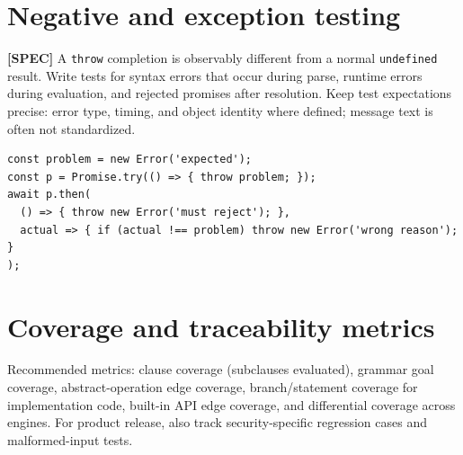 \documentclass[11pt,letterpaper]{article}
\newcommand{\passthrough}[1]{#1}
\begin{document}
\section{Negative and exception testing}\label{negative-and-exception-testing}

\textbf{{[}SPEC{]}} A \passthrough{\lstinline!throw!} completion is observably different from a normal \passthrough{\lstinline!undefined!} result. Write tests for syntax errors that occur during parse, runtime errors during evaluation, and rejected promises after resolution. Keep test expectations precise: error type, timing, and object identity where defined; message text is often not standardized.

\begin{lstlisting}
const problem = new Error('expected');
const p = Promise.try(() => { throw problem; });
await p.then(
  () => { throw new Error('must reject'); },
  actual => { if (actual !== problem) throw new Error('wrong reason'); }
);
\end{lstlisting}

\section{Coverage and traceability metrics}\label{coverage-and-traceability-metrics}

Recommended metrics: clause coverage (subclauses evaluated), grammar goal coverage, abstract-operation edge coverage, branch/statement coverage for implementation code, built-in API edge coverage, and differential coverage across engines. For product release, also track security-specific regression cases and malformed-input tests.
\end{document}
